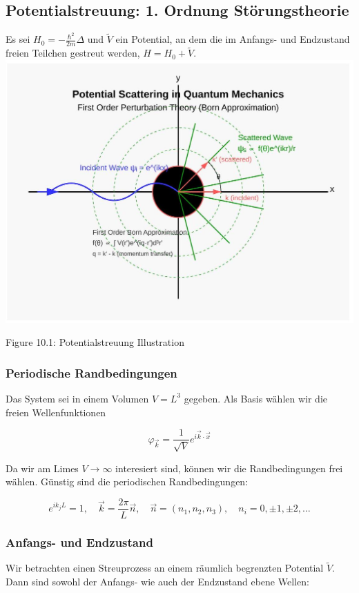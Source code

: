 \documentclass[10pt, letterpaper]{article}
\begin{document}
\subsection*{Potentialstreuung: 1. Ordnung Störungstheorie}
Es sei $H_{0}=-\frac{\hbar^{2}}{2 m} \Delta$ und $\tilde{V}$ ein Potential, an dem die im Anfangs- und Endzustand freien Teilchen gestreut werden, $H=H_{0}+\tilde{V}$.\\
\includegraphics[max width=\textwidth, center]{2025_06_07_f7019c98c95e0473d81eg-10}

Figure 10.1: Potentialstreuung Illustration

\subsubsection*{Periodische Randbedingungen}
Das System sei in einem Volumen $V=L^{3}$ gegeben. Als Basis wählen wir die freien Wellenfunktionen

$$
\varphi_{\vec{k}}=\frac{1}{\sqrt{V}} e^{i \vec{k} \cdot \vec{x}}
$$

Da wir am Limes $V \rightarrow \infty$ interesiert sind, können wir die Randbedingungen frei wählen. Günstig sind die periodischen Randbedingungen:

$$
e^{i k_{j} L}=1, \quad \vec{k}=\frac{2 \pi}{L} \vec{n}, \quad \vec{n}=\left(n_{1}, n_{2}, n_{3}\right), \quad n_{i}=0, \pm 1, \pm 2, \ldots
$$

\subsubsection*{Anfangs- und Endzustand}
Wir betrachten einen Streuprozess an einem räumlich begrenzten Potential $\tilde{V}$. Dann sind sowohl der Anfangs- wie auch der Endzustand ebene Wellen:
\end{document}
